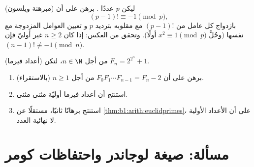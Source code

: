 \begin{exercise}[$\star\star\star$]\label{exo:b1:arith:11}
(مبرهنة ويلسون) ليكن $p$ عددًا . برهن على أن
\[
(p-1)! \equiv -1 \pmod p ,
\]
بازدواج كل عامل من $(p-1)!$ مع مقلوبه بترديد $p$ و
تعيين العوامل المزدوجة مع نفسها (وحُلَّ $x^2 \equiv 1 \pmod p$
أولًا). وتحقق من العكس: إذا كان $n \geq 2$ غير أوليّ فإن $(n-1)!
\not\equiv -1 \pmod n$.
\end{exercise}

\begin{exercise}[$\star\star\star$]\label{exo:b1:arith:12}
(أعداد فيرما) من أجل $n \in \N$، لتكن $F_n = 2^{2^n} + 1$.
\begin{enumerate}
  \item برهن على أن $F_0 F_1 \cdots F_{n-1} = F_n - 2$ من أجل $n \geq
        1$ (بالاستقراء).
  \item استنتج أن أعداد فيرما أوليّة مثنى مثنى.
  \item استنتج برهانًا ثانيًا، مستقلًا عن
        \cref{thm:b1:arith:euclidprimes}، على أن الأعداد الأولية
        لا نهائية العدد.
\end{enumerate}
\end{exercise}

\section{مسألة: صيغة لوجاندر واحتفاظات كومر}

